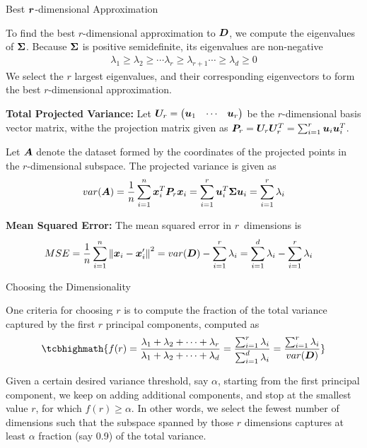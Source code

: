 


\begin{frame}{Best $\textbf{\textit{r}}$-dimensional Approximation}
  \small

To f\/{i}nd the best $r$-dimensional
approximation to ${\boldsymbol D}$,
we compute the eigenvalues of ${\bm \Sigma}$.
Because ${\bm \Sigma}$ is positive
  semidef\/{i}nite, its eigenvalues are non-negative
\begin{align*}
  \lambda_{1} \geq \lambda_{2} \geq \cdots \lambda_{r}\geq
  \lambda_{r+1} \cdots \geq \lambda_{d} \ge 0
\end{align*}
We select the $r$ largest eigenvalues, and their
corresponding eigenvectors to form the best $r$-dimensional
approximation.

\medskip
{\bf Total Projected Variance:}
Let ${\boldsymbol U}_r = \begin{pmatrix} {\boldsymbol u}_1 & \cdots & {\boldsymbol u}_r  \end{pmatrix}$ be the $r$-dimensional
basis vector matrix, withe the 
projection matrix given as
${\boldsymbol P}_r = {\boldsymbol U}_r{\boldsymbol U}_r^T = \sum_{i=1}^r {\boldsymbol u}_i {\boldsymbol u}_i^T$.

\medskip
Let ${\boldsymbol A}$ denote the dataset formed by the coordinates of the
projected points in the \hbox{$r$-dimensional} subspace.
The projected variance is given as
\begin{align*}
    var({\boldsymbol A}) = {1\over n} \sum_{i=1}^n {\boldsymbol x}_i^T{\boldsymbol P}_r{\boldsymbol x}_i =
    \sum_{i=1}^r {\boldsymbol u}_i^T {\bm \Sigma} {\boldsymbol u}_i = \sum_{i=1}^r \lambda_i
\end{align*}

\medskip
{\bf Mean Squared Error:}
The mean squared error in $r$~dimensions is
\begin{align*}
    MSE &= {1\over n} \sum_{i=1}^n \left\lVert{\boldsymbol x}_i -
    {\boldsymbol x}_i'\right\rVert^2 = 
    var({\boldsymbol D}) - \sum_{i=1}^r \lambda_i = 
	\sum_{i=1}^d \lambda_i - \sum_{i=1}^r \lambda_i
\end{align*}
\end{frame}



\begin{frame}{Choosing the Dimensionality}

  One criteria for
choosing $r$ is to compute the fraction of the total variance
captured by the
f\/{i}rst $r$ principal components, computed as
\begin{align*}
\tcbhighmath{
  f(r) =
  \frac{\lambda_1+\lambda_2+\cdots+\lambda_r}
  {\lambda_1+\lambda_2+\cdots+\lambda_d}
  = \frac{\sum_{i=1}^r \lambda_i}{\sum_{i=1}^d \lambda_i}
  = \frac{\sum_{i=1}^r \lambda_i}{var(\bD)}
}
  \label{eq:eda:dimr:fracvar}
\end{align*}

Given a certain desired variance threshold, say $\alpha$,
starting from
the f\/{i}rst principal component, we keep on adding additional
components, and stop at the smallest value $r$,
for which $f(r) \geq \alpha$. In other words, we select the
fewest number of dimensions such that the subspace spanned by
those $r$ dimensions captures at least $\alpha$ fraction (say 0.9) 
of the
total variance.
\end{frame}


